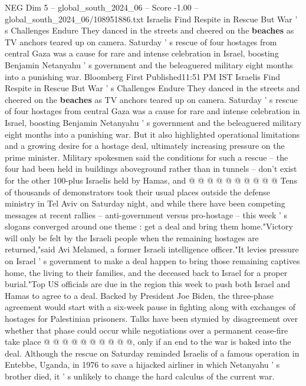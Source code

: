 \begin{textsample}{NEG Dim 5 – global\_south\_2024\_06 – Score -1.00 – global\_south\_2024\_06/108951886.txt}  \label{ex:f5_neg_231}
Israelis Find Respite in Rescue But War ' s Challenges Endure They danced in the streets and cheered on the \textbf{beaches} as TV anchors teared up on camera.
Saturday ' s rescue of four hostages from central Gaza was a cause for rare and intense celebration in Israel, boosting Benjamin Netanyahu ' s government and the beleaguered military eight months into a punishing war.
Bloomberg First Published11:51 PM IST Israelis Find Respite in Rescue But War ' s Challenges Endure They danced in the streets and cheered on the \textbf{beaches} as TV anchors teared up on camera.
Saturday ' s rescue of four hostages from central Gaza was a cause for rare and intense celebration in Israel, boosting Benjamin Netanyahu ' s government and the beleaguered military eight months into a punishing war.
But it also highlighted operational limitations and a growing desire for a hostage deal, ultimately increasing pressure on the prime minister.
Military spokesmen said the conditions for such a rescue -- the four had been held in buildings aboveground rather than in tunnels -- don't exist for the other 100-plus Israelis held by Hamas, and @ @ @ @ @ @ @ @ @ @ Tens of thousands of demonstrators took their usual places outside the defense ministry in Tel Aviv on Saturday night, and while there have been competing messages at recent rallies -- anti-government versus pro-hostage -- this week ' s slogans converged around one theme : get a deal and bring them home."Victory will only be felt by the Israeli people when the remaining hostages are returned,"said Avi Melamed, a former Israeli intelligence officer."It levies pressure on Israel ' s government to make a deal happen to bring those remaining captives home, the living to their families, and the deceased back to Israel for a proper burial."Top US officials are due in the region this week to push both Israel and Hamas to agree to a deal.
Backed by President Joe Biden, the three-phase agreement would start with a six-week pause in fighting along with exchanges of hostages for Palestinian prisoners.
Talks have been stymied by disagreement over whether that phase could occur while negotiations over a permanent cease-fire take place @ @ @ @ @ @ @ @ @ @, only if an end to the war is baked into the deal.
Although the rescue on Saturday reminded Israelis of a famous operation in Entebbe, Uganda, in 1976 to save a hijacked airliner in which Netanyahu ' s brother died, it ' s unlikely to change the hard calculus of the current war.

\end{textsample}
